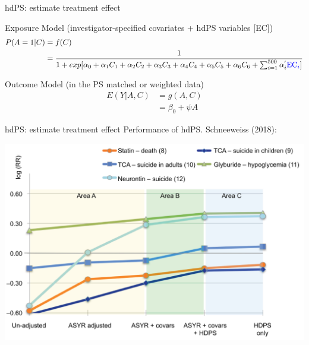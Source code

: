 \documentclass[
  ignorenonframetext,
  aspectratio=169]{beamer}
\begin{document}
\begin{frame}{hdPS: estimate treatment effect}
\protect\hypertarget{hdps-estimate-treatment-effect-1}{}
\begin{block}{Exposure Model (investigator-specified covariates + hdPS
variables {[}EC{]})}
\protect\hypertarget{exposure-model-investigator-specified-covariates-hdps-variables-ec}{}
\begin{equation}
\begin{aligned}
P(A=1|C) &= f(C) \\
        &= \frac{1}{1+exp[\alpha_0 + \alpha_1 C_1 + \alpha_2 C_2 + \alpha_3 C_3 + \alpha_4 C_4 + \alpha_5 C_5 + \alpha_6 C_6 +  \sum_{i=1}^{500} \alpha_i^{'} \textcolor{blue}{\text{EC}_i} ]}\nonumber
\end{aligned}
\end{equation}
\end{block}

\begin{block}{Outcome Model (in the PS matched or weighted data)}
\protect\hypertarget{outcome-model-in-the-ps-matched-or-weighted-data-1}{}
\begin{equation}
\begin{aligned}
E(Y|A,C) &= g(A,C)\\
&= \beta_0 + \psi A \nonumber
\end{aligned}
\end{equation}
\end{block}
\end{frame}

\begin{frame}{hdPS: estimate treatment effect}
\protect\hypertarget{hdps-estimate-treatment-effect-2}{}
Performance of hdPS. Schneeweiss (2018):

\begin{center}
\includegraphics[width=0.6\linewidth]{hdpsonly.png}
\end{center}
\end{frame}
\end{document}
